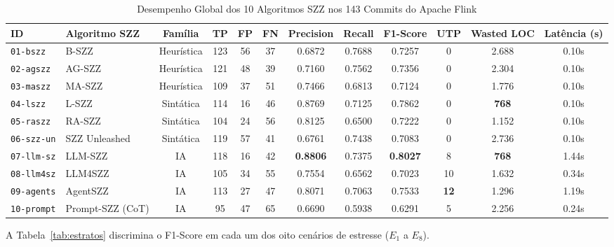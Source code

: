 \documentclass[10pt,journal,compsoc]{IEEEtran}
\begin{document}
\begin{table}[t]
\centering
\caption{Desempenho Global dos 10 Algoritmos SZZ nos 143 Commits do Apache Flink}
\label{tab:global}
\begin{tabular}{llcccccccccc}
\toprule
\textbf{ID} & \textbf{Algoritmo SZZ} & \textbf{Família} & \textbf{TP} & \textbf{FP} & \textbf{FN} & \textbf{Precision} & \textbf{Recall} & \textbf{F1-Score} & \textbf{UTP} & \textbf{Wasted LOC} & \textbf{Latência (s)} \\
\midrule
\texttt{01-bszz} & B-SZZ \cite{sliwerski2005changes} & Heurística & 123 & 56 & 37 & 0.6872 & 0.7688 & 0.7257 & 0 & 2.688 & 0.10s \\
\texttt{02-agszz} & AG-SZZ \cite{kim2006automatic} & Heurística & 121 & 48 & 39 & 0.7160 & 0.7562 & 0.7356 & 0 & 2.304 & 0.10s \\
\texttt{03-maszz} & MA-SZZ \cite{dacosta2017evaluating} & Heurística & 109 & 37 & 51 & 0.7466 & 0.6813 & 0.7124 & 0 & 1.776 & 0.10s \\
\texttt{04-lszz} & L-SZZ \cite{rosa2021evaluating} & Sintática & 114 & 16 & 46 & 0.8769 & 0.7125 & 0.7862 & 0 & \textbf{768} & 0.10s \\
\texttt{05-raszz} & RA-SZZ \cite{fan2021impact} & Sintática & 104 & 24 & 56 & 0.8125 & 0.6500 & 0.7222 & 0 & 1.152 & 0.10s \\
\texttt{06-szz-un} & SZZ Unleashed \cite{borg2019szz} & Sintática & 119 & 57 & 41 & 0.6761 & 0.7438 & 0.7083 & 0 & 2.736 & 0.10s \\
\texttt{07-llm-sz} & LLM-SZZ \cite{fan2024vulnerability} & IA & 118 & 16 & 42 & \textbf{0.8806} & 0.7375 & \textbf{0.8027} & 8 & \textbf{768} & 1.44s \\
\texttt{08-llm4sz} & LLM4SZZ \cite{tang2025llm4szz} & IA & 105 & 34 & 55 & 0.7554 & 0.6562 & 0.7023 & 10 & 1.632 & 0.34s \\
\texttt{09-agents} & AgentSZZ \cite{risse2026agentszz} & IA & 113 & 27 & 47 & 0.8071 & 0.7063 & 0.7533 & \textbf{12} & 1.296 & 1.19s \\
\texttt{10-prompt} & Prompt-SZZ (CoT) & IA & 95 & 47 & 65 & 0.6690 & 0.5938 & 0.6291 & 5 & 2.256 & 0.24s \\
\bottomrule
\end{tabular}
\end{table}

A Tabela~\ref{tab:estratos} discrimina o F1-Score em cada um dos oito cenários de estresse ($E_1$ a $E_8$).
\end{document}
